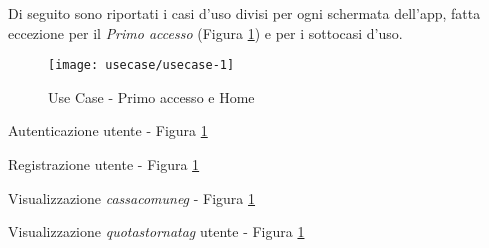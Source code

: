 Di seguito sono riportati i casi d'uso divisi per ogni schermata dell'app, fatta eccezione per il \emph{Primo accesso} (Figura \ref{fig:uc-accessoehome}) e per i sottocasi d'uso.\newline


\begin{figure}[!h] 
    \centering 
    \texttt{[image: usecase/usecase-1]} 
    \caption{Use Case - Primo accesso e Home}
    \label{fig:uc-accessoehome}
\end{figure}

\begin{usecase}{1}{Autenticazione utente} - Figura \ref{fig:uc-accessoehome}
    \label{uc:autenticazione-utente}
\end{usecase}

\begin{usecase}{2}{Registrazione utente} - Figura \ref{fig:uc-accessoehome}
    \label{uc:registrazione-utente}
\end{usecase}

\begin{usecase}{3}{Visualizzazione \emph{\gls{cassacomuneg}}} - Figura \ref{fig:uc-accessoehome}
    \label{uc:visualizza-casacomune}
\end{usecase}

\begin{usecase}{4}{Visualizzazione \emph{\gls{quotastornatag}} utente} - Figura \ref{fig:uc-accessoehome}
    \label{uc:visualizza-quotastornata}
\end{usecase}


